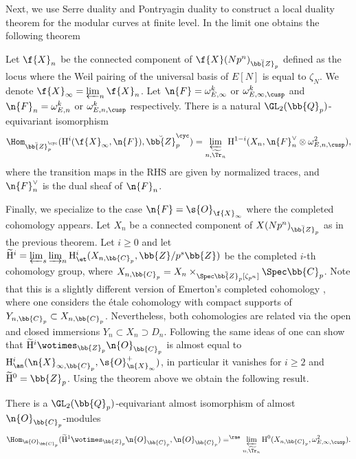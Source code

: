 Next, we use Serre duality and Pontryagin duality to construct a local duality theorem for the modular curves at finite level. In the limit one obtains the following theorem
\begin{theo}
\label{Theo3Intro}
Let $\f{X}_n$ be the connected component of $\f{X}(Np^n)_{\breve{\bb{Z}}_p}$ defined as the locus where the Weil pairing of the universal basis of $E[N]$ is equal to $\zeta_{N}$. We denote $\f{X}_{\infty}= \varprojlim_n \f{X}_n$. Let $\n{F}= \omega^k_{E,\infty}$ or $\omega^k_{E,\infty, \cusp}$ and $\n{F}_n= \omega^k_{E,n}$ or $\omega^k_{E,n,\cusp}$ respectively. There is a natural $\GL_2(\bb{Q}_p)$-equivariant isomorphism
\[
\Hom_{\breve{\bb{Z}}_p^{\cyc} }(\mathrm{H}^i(\f{X}_{\infty}, \n{F}), \breve{\bb{Z}}_p^{\cyc}) = \varprojlim_{n, \widetilde{\Tr}_n} \mathrm{H}^{1-i}(X_n, \n{F}^\vee_n \otimes \omega^2_{E,n,\cusp}),
\]
where the transition maps in the RHS are given by normalized traces, and $\n{F}_n^\vee$ is the dual sheaf of $\n{F}_n$.
\end{theo}
Finally, we specialize to the case $\n{F}= \s{O}_{\f{X}_{\infty}}$ where the completed cohomology appears. Let $X_n$ be a connected component of $X(Np^n)_{\breve{\bb{Z}}_p}$ as in the previous theorem. Let $i\geq 0$ and let $\widetilde{\mathrm{H}}^i= \varprojlim_s \varinjlim_n \mathrm{H}^i_{\et}(X_{n,\bb{C}_p}, \bb{Z}/p^s \bb{Z})$ be the completed $i$-th cohomology group, where $X_{n,\bb{C}_p}= X_n\times_{\Spec \breve{\bb{Z}}_p[\zeta_{p^n}] }\Spec \bb{C}_p$. Note that this is a slightly different version of Emerton's completed cohomology \cite{MR2207783}, where one considers the étale cohomology with compact supports of $Y_{n,\bb{C}_p}\subset X_{n,\bb{C}_p}$. Nevertheless, both cohomologies are related via the open and closed immersions $Y_n \subset X_n \supset D_n$. Following the same ideas of \cite[\S 4.2]{scholzeTorsCoho2015} one can show that $\widetilde{\mathrm{H}}^i\wotimes_{\bb{Z}_p} \n{O}_{\bb{C}_p}$ is almost equal to $\mathrm{H}^i_{\an}(\n{X}_{\infty, \bb{C}_p}, \s{O}^+_{\n{X}_{\infty}})$, in particular it vanishes for $i\geq 2$ and $\widetilde{\mathrm{H}}^0= \bb{Z}_p$. Using the theorem above we obtain the following result.

\begin{theo}
\label{Theo4Intro}
There is a $\GL_2(\bb{Q}_p)$-equivariant almost isomorphism of almost $\n{O}_{\bb{C}_p}$\nobreakdash-modules
\[
\Hom_{\n{O}_{\bb{C}_p}}(\widetilde{\mathrm{H}}^1\wotimes_{\bb{Z}_p} \n{O}_{\bb{C}_p}, \n{O}_{\bb{C}_p})=^{\rae} \varprojlim_{n, \widetilde{\Tr}_n} \mathrm{H}^0(X_{n,\bb{C}_p}, \omega^2_{E,\infty,\cusp}).
\]
\end{theo}

